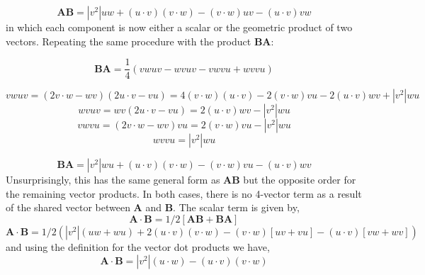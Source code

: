 \documentclass[11pt]{article} %
\begin{document}
\begin{equation}
\mathbf{A} \mathbf{B} =  |v^2| uw +  (u \cdot v ) ( v \cdot w)   -  (v \cdot w) uv -  ( u \cdot v) vw 
\end{equation}
in which each component is now either a scalar or the geometric product of two vectors. 
Repeating the same procedure with the product $\mathbf{BA}$:

\begin{equation}
\mathbf{B} \mathbf{A} = \frac{1}{4} (vwuv   - wvuv  - vwvu + wvvu      ) 
\end{equation}

\begin{equation}
vwuv  = (2 v \cdot w - wv)(2 u \cdot v - vu) = 4 ( v \cdot w)(u \cdot v) - 2 (v \cdot w) vu - 2 (u \cdot v) wv + |v^2| wu
\end{equation}
\begin{equation}
wvuv  = wv (2 u \cdot v - vu) = 2 (u \cdot v)wv  - |v^2| wu 
\end{equation}
\begin{equation}
vwvu  = (2 v \cdot w - wv) vu = 2 (v \cdot w) vu - |v^2| wu
\end{equation}
\begin{equation}
wvvu  =  |v^2| wu 
\end{equation}


\begin{equation}
\mathbf{B} \mathbf{A} =    |v^2| wu +  (u \cdot v)( v \cdot w) -  (v \cdot w) vu -   (u \cdot v) wv     
\end{equation}
Unsurprisingly, this has the same general form as $\mathbf{AB}$ but the opposite order for the remaining vector products. In both cases, there is no 4-vector term as a result of the shared vector between $\mathbf{A}$ and $\mathbf{B}$. The scalar term is given by,
\begin{equation}
\mathbf{A} \cdot \mathbf{B} = 1/2 [ \mathbf{AB} + \mathbf{BA} ] 
\end{equation}
\begin{equation}
\mathbf{A} \cdot \mathbf{B} = 1/2(  |v^2| (uw + wu) +2  (u \cdot v ) ( v \cdot w)   -  (v \cdot w) [uv+vu] -  ( u \cdot v) [vw+wv]       )
\end{equation}
and using the definition for the vector dot products we have,
\begin{equation}
\mathbf{A} \cdot \mathbf{B} =    |v^2| (u \cdot w  ) -  (u \cdot v ) ( v \cdot w)     
\end{equation}
\end{document}
